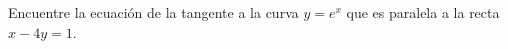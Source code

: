 \item Encuentre la ecuación de la tangente a la curva $y = e^x$ que es paralela a la recta $x - 4y = 1$.
